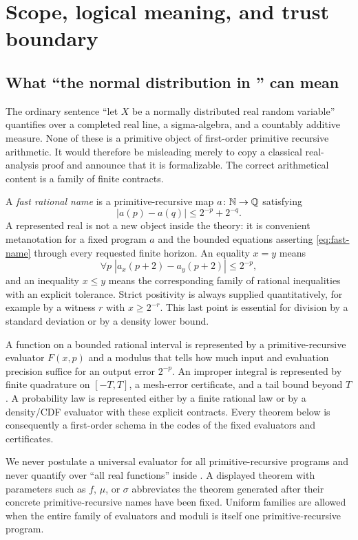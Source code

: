 \section{Scope, logical meaning, and trust boundary}

\subsection{What ``the normal distribution in \ipra'' can mean}

The ordinary sentence ``let $X$ be a normally distributed real random variable'' quantifies over a completed real line, a sigma-algebra, and a countably additive measure.  None of these is a primitive object of first-order primitive recursive arithmetic.  It would therefore be misleading merely to copy a classical real-analysis proof and announce that it is formalizable.  The correct arithmetical content is a family of finite contracts.

A \emph{fast rational name} is a primitive-recursive map $a\colon\mathbb N\to\mathbb Q$ satisfying
\begin{equation}\label{eq:fast-name}
  |a(p)-a(q)|\le 2^{-p}+2^{-q}.
\end{equation}
A represented real is not a new object inside the theory: it is convenient metanotation for a fixed program $a$ and the bounded equations asserting \eqref{eq:fast-name} through every requested finite horizon.  An equality $x=y$ means
\[
  \forall p\; |a_x(p+2)-a_y(p+2)|\le 2^{-p},
\]
and an inequality $x\le y$ means the corresponding family of rational inequalities with an explicit tolerance.  Strict positivity is always supplied quantitatively, for example by a witness $r$ with $x\ge 2^{-r}$.  This last point is essential for division by a standard deviation or by a density lower bound.

A function on a bounded rational interval is represented by a primitive-recursive evaluator $F(x,p)$ and a modulus that tells how much input and evaluation precision suffice for an output error $2^{-p}$.  An improper integral is represented by finite quadrature on $[-T,T]$, a mesh-error certificate, and a tail bound beyond $T$.  A probability law is represented either by a finite rational law or by a density/CDF evaluator with these explicit contracts.  Every theorem below is consequently a first-order schema in the codes of the fixed evaluators and certificates.

\begin{remark}
We never postulate a universal evaluator for all primitive-recursive programs and never quantify over ``all real functions'' inside \ipra.  A displayed theorem with parameters such as $f$, $\mu$, or $\sigma$ abbreviates the theorem generated after their concrete primitive-recursive names have been fixed.  Uniform families are allowed when the entire family of evaluators and moduli is itself one primitive-recursive program.
\end{remark}

